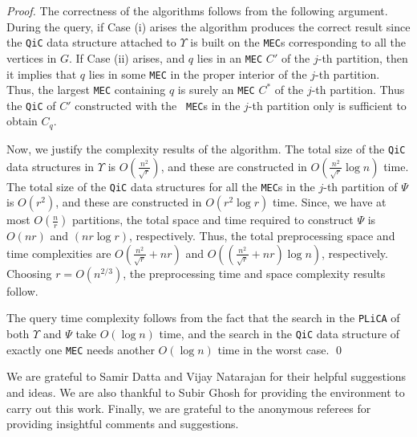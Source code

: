 \documentclass[12pt]{llncs}
\begin{document}
\begin{proof}
The correctness of the algorithms follows from the following argument. During the 
query, 
if Case (i) arises the algorithm produces the correct result since the {\tt QiC} data 
structure attached to $\Upsilon$ is built on the {\tt MEC}s corresponding to all 
the vertices in $G$.  If Case (ii) arises, and $q$ lies in an {\tt MEC} $C'$ of the $j$-th 
partition, then it implies that $q$ lies in some {\tt MEC} in the proper interior of the 
$j$-th partition. Thus, the largest {\tt MEC} containing $q$ is surely an {\tt MEC} $C^*$ 
of the $j$-th partition. Thus the {\tt QiC} of $C'$ constructed with the {\tt 
MEC}s in the $j$-th partition only is sufficient to obtain $C_q$.      

Now, we justify the complexity results of the algorithm. The total size of the {\tt QiC} 
data structures in $\Upsilon$ is $O(\frac{n^2}{\sqrt{r}})$, and these are constructed in 
$O(\frac{n^2}{\sqrt{r}}\log n)$ time. The total size of the {\tt QiC} data structures for 
all the {\tt MEC}s in the $j$-th partition of $\Psi$ is $O(r^2)$, and these are 
constructed 
in $O(r^2\log r)$ time. Since, we have at most $O(\frac{n}{r})$ partitions, the total 
space 
and time required to construct $\Psi$ is $O(nr)$ and $(nr\log r)$, respectively. Thus, 
the 
total preprocessing space and time complexities are $O(\frac{n^2}{\sqrt{r}}+nr)$ and 
$O((\frac{n^2}{\sqrt{r}}+nr)\log n)$, respectively. Choosing $r=O(n^{2/3})$, the 
preprocessing 
time and space complexity results follow.

The query time complexity follows from the fact that the search in the {\tt PLiCA} of 
both 
$\Upsilon$ and $\Psi$ take $O(\log n)$ time, and the search in the {\tt QiC} data structure 
of 
exactly one {\tt MEC} needs another $O(\log n)$ time in the worst case. 
\qed
\end{proof}
 
 We are grateful to Samir Datta and
Vijay Natarajan for their helpful suggestions and ideas.
We are also thankful to Subir Ghosh for providing the environment to
carry out this work.  
Finally, we are grateful to the anonymous referees for providing insightful comments and suggestions.
\end{document}

